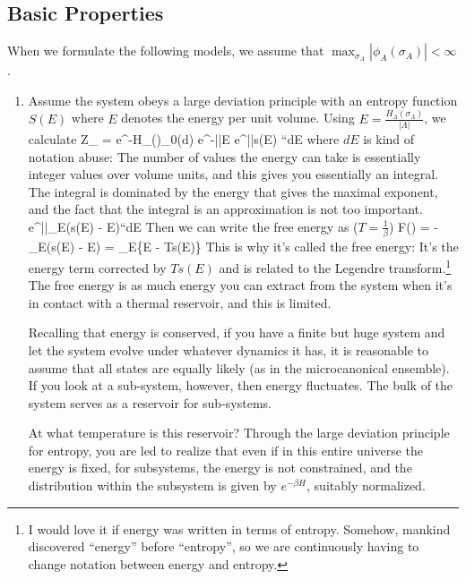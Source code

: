 \subsection{Basic Properties}

When we formulate the following models, we assume that $\max_{\sigma_A} |\phi_A(\sigma_A)| < \infty$. 

\begin{enumerate}
 
\item Assume the system obeys a large deviation principle with an entropy function $S(E) $ where $E$ denotes the energy per unit volume. Using $E = \frac{H_{\Lambda}(\sigma_{\Lambda})}{|\Lambda|}$, we calculate
\be
Z_{\Lambda} = \int e^{-\beta H_{\Lambda}(\sigma)}\rho_0(d\sigma) \approx \int e^{-\beta|\Lambda|\cdot E} e^{|\Lambda|s(E)} ``dE
\ee
where $dE$ is kind of notation abuse: The number of values the energy can take is essentially integer values over volume units, and this gives you essentially an integral. %
The integral is dominated by the energy that gives the maximal exponent, and the fact that the integral is an approximation is not too important.
\be
\int e^{|\Lambda|\max_E(s(E) - \beta E)}``dE
\ee
Then we can write the free energy as ($T=\frac{1}{\beta}$)
\be
F(\beta) = -  \max_E(s(E) - \beta E) = _E\{E - Ts(E)\}
\ee
This is why it's called the free energy: It's the energy term corrected by $Ts(E)$ and is related to the Legendre transform.\footnote{I would love it if energy was written in terms of entropy. Somehow, mankind discovered ``energy'' before ``entropy'', so we are continuously having to change notation between energy and entropy.} The free energy is as much energy you can extract from the system when it's in contact with a thermal reservoir, and this is limited. 

Recalling that energy is conserved, if you have a finite but huge system and let the system evolve under whatever dynamics it has, it is reasonable to assume that all states are equally likely (as in the microcanonical ensemble). If you look at a sub-system, however, then energy fluctuates. The bulk of the system serves as a reservoir for sub-systems. 

At what temperature is this reservoir? Through the large deviation principle for entropy, you are led to realize that even if in this entire universe the energy is fixed, for subsystems, the energy is not constrained, and the distribution within the subsystem is given by $e^{-\beta H}$, suitably normalized. 


\end{enumerate}
